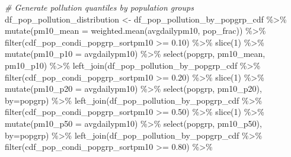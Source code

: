 \documentclass[
]{book}
\newenvironment{Shaded}{\begin{snugshade}}{\end{snugshade}}
\newcommand{\AttributeTok}[1]{\textcolor[rgb]{0.77,0.63,0.00}{#1}}
\newcommand{\CommentTok}[1]{\textcolor[rgb]{0.56,0.35,0.01}{\textit{#1}}}
\newcommand{\DecValTok}[1]{\textcolor[rgb]{0.00,0.00,0.81}{#1}}
\newcommand{\FloatTok}[1]{\textcolor[rgb]{0.00,0.00,0.81}{#1}}
\newcommand{\FunctionTok}[1]{\textcolor[rgb]{0.00,0.00,0.00}{#1}}
\newcommand{\NormalTok}[1]{#1}
\newcommand{\OtherTok}[1]{\textcolor[rgb]{0.56,0.35,0.01}{#1}}
\newcommand{\SpecialCharTok}[1]{\textcolor[rgb]{0.00,0.00,0.00}{#1}}
\newcommand{\StringTok}[1]{\textcolor[rgb]{0.31,0.60,0.02}{#1}}
\begin{document}
\begin{Shaded}
\begin{Highlighting}[]
\CommentTok{\# Generate pollution quantiles by population groups}
\NormalTok{df\_pop\_pollution\_distribution }\OtherTok{\textless{}{-}}\NormalTok{ df\_pop\_pollution\_by\_popgrp\_cdf }\SpecialCharTok{\%\textgreater{}\%} 
  \FunctionTok{mutate}\NormalTok{(}\AttributeTok{pm10\_mean =} \FunctionTok{weighted.mean}\NormalTok{(avgdailypm10, pop\_frac)) }\SpecialCharTok{\%\textgreater{}\%}
  \FunctionTok{filter}\NormalTok{(cdf\_pop\_condi\_popgrp\_sortpm10 }\SpecialCharTok{\textgreater{}=} \FloatTok{0.10}\NormalTok{) }\SpecialCharTok{\%\textgreater{}\%}
  \FunctionTok{slice}\NormalTok{(}\DecValTok{1}\NormalTok{) }\SpecialCharTok{\%\textgreater{}\%}
  \FunctionTok{mutate}\NormalTok{(}\AttributeTok{pm10\_p10 =}\NormalTok{ avgdailypm10) }\SpecialCharTok{\%\textgreater{}\%}
  \FunctionTok{select}\NormalTok{(popgrp, pm10\_mean, pm10\_p10) }\SpecialCharTok{\%\textgreater{}\%}
  \FunctionTok{left\_join}\NormalTok{(df\_pop\_pollution\_by\_popgrp\_cdf }\SpecialCharTok{\%\textgreater{}\%} 
              \FunctionTok{filter}\NormalTok{(cdf\_pop\_condi\_popgrp\_sortpm10 }\SpecialCharTok{\textgreater{}=} \FloatTok{0.20}\NormalTok{) }\SpecialCharTok{\%\textgreater{}\%}
              \FunctionTok{slice}\NormalTok{(}\DecValTok{1}\NormalTok{) }\SpecialCharTok{\%\textgreater{}\%}
              \FunctionTok{mutate}\NormalTok{(}\AttributeTok{pm10\_p20 =}\NormalTok{ avgdailypm10) }\SpecialCharTok{\%\textgreater{}\%}
              \FunctionTok{select}\NormalTok{(popgrp, pm10\_p20), }
            \AttributeTok{by=}\StringTok{\textquotesingle{}popgrp\textquotesingle{}}\NormalTok{) }\SpecialCharTok{\%\textgreater{}\%}
  \FunctionTok{left\_join}\NormalTok{(df\_pop\_pollution\_by\_popgrp\_cdf }\SpecialCharTok{\%\textgreater{}\%} 
              \FunctionTok{filter}\NormalTok{(cdf\_pop\_condi\_popgrp\_sortpm10 }\SpecialCharTok{\textgreater{}=} \FloatTok{0.50}\NormalTok{) }\SpecialCharTok{\%\textgreater{}\%}
              \FunctionTok{slice}\NormalTok{(}\DecValTok{1}\NormalTok{) }\SpecialCharTok{\%\textgreater{}\%}
              \FunctionTok{mutate}\NormalTok{(}\AttributeTok{pm10\_p50 =}\NormalTok{ avgdailypm10) }\SpecialCharTok{\%\textgreater{}\%}
              \FunctionTok{select}\NormalTok{(popgrp, pm10\_p50), }
            \AttributeTok{by=}\StringTok{\textquotesingle{}popgrp\textquotesingle{}}\NormalTok{) }\SpecialCharTok{\%\textgreater{}\%}
  \FunctionTok{left\_join}\NormalTok{(df\_pop\_pollution\_by\_popgrp\_cdf }\SpecialCharTok{\%\textgreater{}\%} 
              \FunctionTok{filter}\NormalTok{(cdf\_pop\_condi\_popgrp\_sortpm10 }\SpecialCharTok{\textgreater{}=} \FloatTok{0.80}\NormalTok{) }\SpecialCharTok{\%\textgreater{}\%}

\end{Highlighting}
\end{Shaded}
\end{document}
